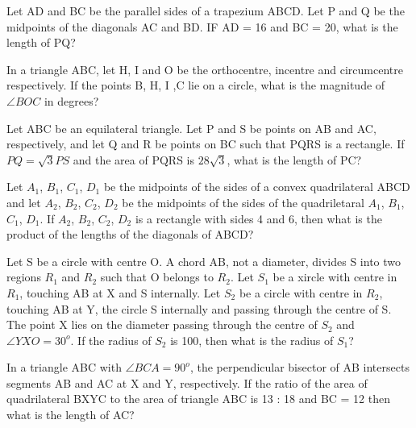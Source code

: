 \item Let AD and BC be the parallel sides of a trapezium ABCD. Let P and Q be the midpoints of the diagonals AC and BD. IF AD  = 16 and BC = 20, what is the length of PQ?

\item In a triangle ABC, let H, I and O be the orthocentre, incentre and circumcentre respectively. If the points B, H, I ,C lie on a circle, what is the magnitude of $\angle BOC$ in degrees?

\item Let ABC be an equilateral triangle. Let P and S be points on AB and AC, respectively, and let Q and R be points on BC such that PQRS is a rectangle. If $PQ = \sqrt{3}PS$ and the area of PQRS is $28\sqrt{3}$, what is the length of PC?

\item Let $A_1$, $B_1$, $C_1$, $D_1$ be the midpoints of the sides of a convex quadrilateral ABCD and let $A_2$, $B_2$, $C_2$, $D_2$ be the midpoints of the sides of the quadriletaral $A_1$, $B_1$, $C_1$, $D_1$. If $A_2$, $B_2$, $C_2$, $D_2$ is a rectangle with sides 4 and 6, then what is the product of the lengths of the diagonals of ABCD?

\item Let S be a circle with centre O. A chord AB, not a diameter, divides S into two regions $R_1$ and $R_2$ such that O belongs to $R_2$. Let $S_1$ be a xircle with centre in $R_1$, touching AB at X and S internally. Let $S_2$ be a circle with centre in $R_2$, touching AB at Y, the circle S internally and passing through the centre of S. The point X lies on the diameter passing through the centre of $S_2$ and $\angle YXO = 30^{o}$. If the radius of $S_2$ is 100, then what is the radius of $S_1$?

\item In a triangle ABC with $\angle BCA = 90^{o}$, the perpendicular bisector of AB intersects segments AB and AC at X and Y, respectively. If the ratio of the area of quadrilateral BXYC to the area of triangle ABC is 13 : 18 and BC = 12 then what is the length of AC?